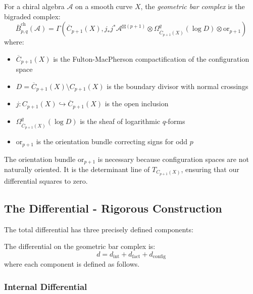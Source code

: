 \begin{definition}\label{def:geom-bar}
For a chiral algebra $\mathcal{A}$ on a smooth curve $X$, the \emph{geometric bar complex} is the bigraded complex:
\[
\bar{B}^{\text{ch}}_{p,q}(\mathcal{A}) = \Gamma\left(\overline{C}_{p+1}(X), j_*j^*\mathcal{A}^{\boxtimes(p+1)} \otimes \Omega^q_{\overline{C}_{p+1}(X)}(\log D) \otimes \text{or}_{p+1}\right)
\]
where:
\begin{itemize}
\item $\overline{C}_{p+1}(X)$ is the Fulton-MacPherson compactification of the configuration space
\item $D = \overline{C}_{p+1}(X) \setminus C_{p+1}(X)$ is the boundary divisor with normal crossings
\item $j: C_{p+1}(X) \hookrightarrow \overline{C}_{p+1}(X)$ is the open inclusion
\item $\Omega^q_{\overline{C}_{p+1}(X)}(\log D)$ is the sheaf of logarithmic $q$-forms
\item $\text{or}_{p+1}$ is the orientation bundle correcting signs for odd $p$
\end{itemize}
\end{definition}
 
\begin{remark}
The orientation bundle $\text{or}_{p+1}$ is necessary because configuration spaces are not naturally 
oriented. It is the determinant line of $T_{C_{p+1}(X)}$, ensuring that our differential squares to zero.
\end{remark}
 
\subsection{The Differential - Rigorous Construction}
 
The total differential has three precisely defined components:
 
\begin{definition}\label{def:diff-total}
The differential on the geometric bar complex is:
\[
d = d_{\text{int}} + d_{\text{fact}} + d_{\text{config}}
\]
where each component is defined as follows.
\end{definition}
 
\subsubsection{Internal Differential}
 
